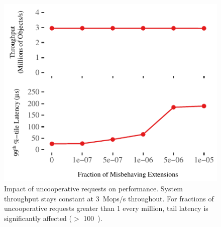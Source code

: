 \begin{figure}[t]
\centering
\includegraphics[width=1.0\columnwidth]{graphs/uncooperative.pdf}
\caption{Impact of uncooperative requests on performance. System
	throughput stays constant at 3~Mops/s throughout. For fractions
	of uncooperative requests greater than 1 every million, tail
	latency is significantly affected ($>$ 100~\us).}
\label{fig:uncooperative}
\end{figure}
